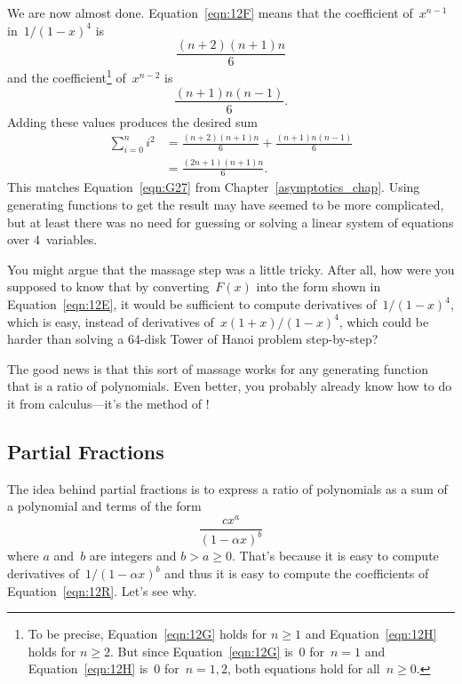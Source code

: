 We are now almost done.  Equation~\ref{eqn:12F} means that the
coefficient of~$x^{n - 1}$ in~$1/(1 - x)^4$ is
\begin{equation}\label{eqn:12G}
    \frac{(n + 2) (n + 1) n}{6}
\end{equation}
and the coefficient\footnote{To be precise, Equation~\ref{eqn:12G}
  holds for $n \ge 1$ and Equation~\ref{eqn:12H} holds for $n \ge 2$.
  But since Equation~\ref{eqn:12G} is~0 for~$n = 1$ and
  Equation~\ref{eqn:12H} is~0 for~$n = 1, 2$, both equations hold for
  all~$n \ge 0$.}  of~$x^{n - 2}$ is
\begin{equation}\label{eqn:12H}
    \frac{(n + 1) n (n - 1)}{6}.
\end{equation}
Adding these values produces the desired sum
\begin{align*}
\sum_{i = 0}^n i^2
    &= \frac{(n + 2) (n + 1) n}{6} + \frac{(n + 1) n (n - 1)}{6} \\
    &= \frac{ (2n + 1) (n + 1) n }{6}.
\end{align*}
This matches Equation~\ref{eqn:G27} from
Chapter~\ref{asymptotics_chap}.  Using generating functions to get the
result may have seemed to be more complicated, but at least there was
no need for guessing or solving a linear system of equations over
4~variables.

You might argue that the massage step was a little tricky.  After all,
how were you supposed to know that by converting~$F(x)$ into the form
shown in Equation~\ref{eqn:12E}, it would be sufficient to compute
derivatives of~$1/(1 - x)^4$, which is easy, instead of derivatives
of~$x (1 + x) / (1 - x)^4$, which could be harder than solving a
64-disk Tower of Hanoi problem step-by-step?

The good news is that this sort of massage works for any generating
function that is a ratio of polynomials.  Even better, you probably
already know how to do it from calculus---it's the method of
!

\subsection{Partial Fractions}\label{sec:partial_fractions}

The idea behind partial fractions is to express a ratio of polynomials
as a sum of a polynomial and terms of the form
\begin{equation}\label{eqn:12R}
    \frac{c x^a}{(1 - \alpha x)^b}
\end{equation}
where $a$ and~$b$ are integers and $b > a \ge 0$.  That's because it
is easy to compute derivatives of~$1/(1 - \alpha x)^b$ and thus it is
easy to compute the coefficients of Equation~\ref{eqn:12R}.  Let's see
why.

